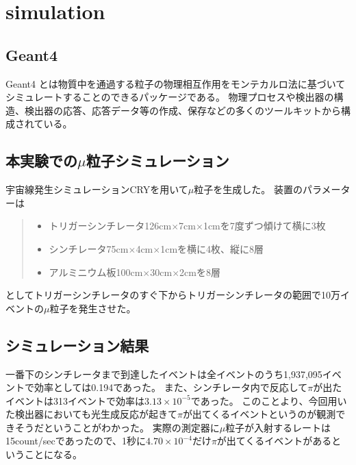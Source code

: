 \chapter{simulation}\label{simulation}
\section{Geant4}
Geant4 とは物質中を通過する粒子の物理相互作用をモンテカルロ法に基づいてシミュレートすることのできるパッケージである。
物理プロセスや検出器の構造、検出器の応答、応答データ等の作成、保存などの多くのツールキットから構成されている。

\section{本実験での$\mu$粒子シミュレーション}
宇宙線発生シミュレーションCRYを用いて$\mu$粒子を生成した。
装置のパラメーターは
    \begin{quote}
        \begin{itemize}
            \item トリガーシンチレータ126cm$\times$7cm$\times$1cmを7度ずつ傾けて横に3枚
            \item シンチレータ75cm$\times$4cm$\times$1cmを横に4枚、縦に8層
            \item アルミニウム板100cm$\times$30cm$\times$2cmを8層
        \end{itemize}
    \end{quote}
としてトリガーシンチレータのすぐ下からトリガーシンチレータの範囲で10万イベントの$\mu$粒子を発生させた。

\section{シミュレーション結果}
一番下のシンチレータまで到達したイベントは全イベントのうち1,937,095イベントで効率としては0.194であった。
また、シンチレータ内で反応して$\pi$が出たイベントは313イベントで効率は$3.13 \times10^{-5}$であった。
このことより、今回用いた検出器においても光生成反応が起きて$\pi$が出てくるイベントというのが観測できそうだということがわかった。
実際の測定器に$\mu$粒子が入射するレートは15count/secであったので、1秒に$4.70 \times10^{-4}$だけ$\pi$が出てくるイベントがあるということになる。

        
